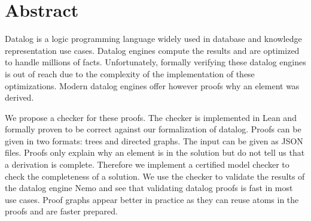 \chapter*{Abstract}
    Datalog is a logic programming language widely used in database and knowledge representation use cases. Datalog engines compute the results and are optimized to handle millions of facts. Unfortunately, formally verifying these datalog engines is out of reach due to the complexity of the implementation of these optimizations. Modern datalog engines offer however proofs why an element was derived.

    We propose a checker for these proofs. The checker is implemented in Lean and formally proven to be correct against our formalization of datalog. Proofs can be given in two formats: trees and directed graphs. The input can be given as JSON files. Proofs only explain why an element is in the solution but do not tell us that a derivation is complete. Therefore we implement a certified model checker to check the completeness of a solution. We use the checker to validate the results of the datalog engine Nemo and see that validating datalog proofs is fast in most use cases. Proof graphs appear better in practice as they can reuse atoms in the proofs and are faster prepared.
